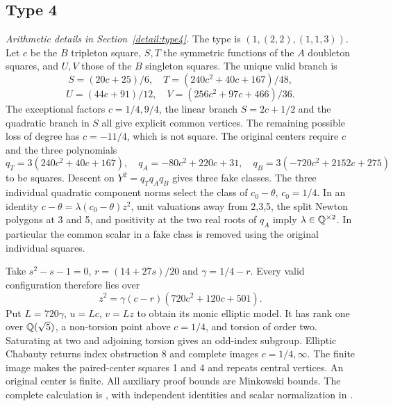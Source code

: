 \subsection{Type 4}\label{app:type4}
\noindent\emph{Arithmetic details in Section~\ref{detail:type4}.}\enspace
The type is $(1,(2,2),(1,1,3))$. Let $c$ be the $B$ tripleton square,
$S,T$ the symmetric functions of the $A$ doubleton squares, and $U,V$
those of the $B$ singleton squares. The unique valid branch is
\[
 S=(20c+25)/6,\quad T=(240c^2+40c+167)/48,
\]\[
 U=(44c+91)/12,\quad V=(256c^2+97c+466)/36.
\]
The exceptional factors $c=1/4,9/4$, the linear branch $S=2c+1/2$
and the quadratic branch in $S$ all give explicit common vertices.
The remaining possible loss of degree has $c=-11/4$, which is not square.
The original centers require $c$ and the three polynomials
\[
 q_T=3(240c^2+40c+167),\quad q_A=-80c^2+220c+31,
 \quad q_B=3(-720c^2+2152c+275)
\]
to be squares. Descent on $Y^2=q_Tq_Aq_B$ gives three fake classes.
The three individual quadratic component norms select the class of
$c_0-\theta$, $c_0=1/4$. In an identity
$c-\theta=\lambda(c_0-\theta)z^2$, unit valuations away from 2,3,5,
the split Newton polygons at 3 and 5, and positivity at the two real
roots of $q_A$ imply $\lambda\in\mathbb Q^{\times2}$.
In particular the common scalar in a fake class is removed using the
original individual squares.

Take $s^2-s-1=0$, $r=(14+27s)/20$ and $\gamma=1/4-r$.
Every valid configuration therefore lies over
\[
 z^2=\gamma(c-r)(720c^2+120c+501).
\]
Put $L=720\gamma$, $u=Lc$, $v=Lz$ to obtain its monic elliptic model.
It has rank one over $\mathbb Q(\sqrt5)$, a non-torsion point above
$c=1/4$, and torsion of order two. Saturating at two and adjoining
torsion gives an odd-index subgroup. Elliptic Chabauty returns index
obstruction 8 and complete images $c=1/4,\infty$. The finite image
makes the paired-center squares 1 and 4 and repeats central vertices.
An original center is finite. All auxiliary proof bounds are Minkowski
bounds. The complete calculation is ,
with independent identities and scalar normalization in
.

